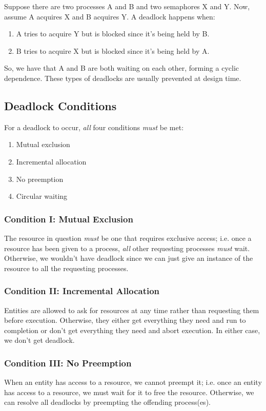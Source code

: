 \documentclass{report}
\newcommand{\exampleBegin}[1]{\begin{tcolorbox}[colback=blue!5!white,colframe=black!75!blue,title={Example:
      #1}]}
\newcommand{\exampleEnd}{\end{tcolorbox}}
\begin{document}
\exampleBegin{Cyclic Dependencies}
Suppose there are two processes A and B and two semaphores X and Y. Now, assume A acquires X and B
acquires Y. A deadlock happens when:

\begin{enumerate}[label=\textit{(\roman*)}]
\item A tries to acquire Y but is blocked since it's being held by B.
\item B tries to acquire X but is blocked since it's being held by A.
\end{enumerate}
So, we have that A and B are both waiting on each other, forming a cyclic dependence. These types of
deadlocks are usually prevented at design time.
\exampleEnd


\subsection{Deadlock Conditions}
\label{subsec:DC}
For a deadlock to occur, \textit{all} four conditions \textit{must} be met:
\begin{enumerate}[label=\textit{(\roman*)}]
\item Mutual exclusion
\item Incremental allocation
\item No preemption
\item Circular waiting
\end{enumerate}


\subsubsection{Condition I: Mutual Exclusion}
The resource in question \textit{must} be one that requires exclusive access; i.e. once a resource
has been given to a process, \textit{all} other requesting processes \textit{must} wait. Otherwise,
we wouldn't have deadlock since we can just give an instance of the resource to all the requesting
processes. 


\subsubsection{Condition II: Incremental Allocation}
Entities are allowed to ask for resources at any time rather than requesting them before
execution. Otherwise, they either get everything they need and run to completion or don't get
everything they need and abort execution. In either case, we don't get deadlock.


\subsubsection{Condition III: No Preemption}
When an entity has access to a resource, we cannot preempt it; i.e. once an entity has access to a
resource, we must wait for it to free the resource. Otherwise, we can resolve all deadlocks by preempting the
offending process(es). 
\end{document}
